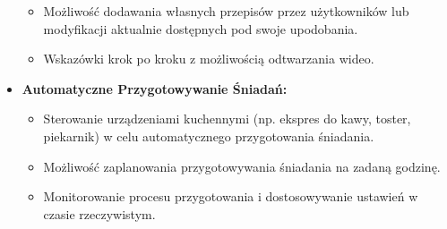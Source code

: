 \documentclass[a4paper,12pt]{article}
\begin{document}
\begin{itemize}
\begin{itemize}
            \item Możliwość dodawania własnych przepisów przez użytkowników lub modyfikacji aktualnie dostępnych pod swoje upodobania.
            \item Wskazówki krok po kroku z możliwością odtwarzania wideo.
        \end{itemize}
        \item \textbf{Automatyczne Przygotowywanie Śniadań:}
        \begin{itemize}
            \item Sterowanie urządzeniami kuchennymi (np.
            ekspres do kawy, toster, piekarnik) w celu automatycznego przygotowania śniadania.
            \item Możliwość zaplanowania przygotowywania śniadania na zadaną godzinę.
            \item Monitorowanie procesu przygotowania i dostosowywanie ustawień w czasie rzeczywistym.
        \end{itemize}
    \end{itemize}
\end{document}
